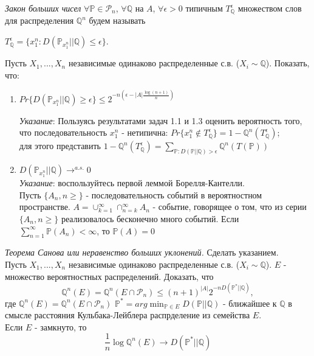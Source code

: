 \begin{problem}
\textit{Закон больших чисел}
$\forall \mathbb{P} \in \mathcal{P}_n $, $\forall \mathbb{Q}$ на $A$, $\forall \epsilon > 0$ типичным $T_{\mathbb{Q}}^{\epsilon}$ множеством слов для распределения $\mathbb{Q}^n$ будем называть
\begin{center}
$T_{\mathbb{Q}}^{\epsilon} = \{x_1^n: D(\mathbb{P}_{x_1^n}|| \mathbb{Q}) \leq \epsilon \}$.
\end{center}
Пусть $X_1, ..., X_n$ независимые одинаково распределенные с.в. ($X_i \sim \mathbb{Q}$). Показать, что:
\begin{enumerate}
\item 
\begin{center}
$Pr\{D(\mathbb{P}_{x_1^n} || \mathbb{Q}) \geq \epsilon \} \leq 2^{-n(\epsilon - |A|\frac{\log(n+1)}{n})}$
\end{center}
\textit{Указание}:
Пользуясь результатами задач 1.1 и 1.3 оценить вероятность того, что последовательность $x_1^n$ - нетипична: $Pr\{x_1^n \not\in T_{\mathbb{Q}}^{\epsilon}\} = 1 - \mathbb{Q}^n(T_{\mathbb{Q}}^{\epsilon})$;\\
для этого представить $1 - \mathbb{Q}^n(T_{\mathbb{Q}}^{\epsilon}) = \sum_{\mathbb{P}: D(\mathbb{P}||\mathbb{Q}) > \epsilon}{ \mathbb{Q}^n(T(\mathbb{P}))}$ 
\item $D(\mathbb{P}_{x_1^n}||\mathbb{Q})\rightarrow^{a.s.}0$\\
\textit{Указание}: воспользуйтесь первой леммой Борелля-Кантелли.\\
Пусть $\{A_n, n \geq \}$ - последовательность событий в вероятностном пространстве. $A = \cup_{k = 1}^{\infty} \cap_{n = k}^{\infty} A_n$ - событие, говорящее о том, что из серии $\{A_n, n \geq \}$ реализовалось бесконечно много событий.
Если $\sum_{n=1}^{\infty}\mathbb{P}(A_n) < \infty$, то $\mathbb{P}(A) = 0$
\end{enumerate}
\end{problem}

\begin{problem} \textit{Теорема Санова или неравенство больших уклонений.} Сделать указанием.\\
Пусть $X_1, ..., X_n$ независимые одинаково распределенные с.в. ($X_i \sim \mathbb{Q}$). $E$ - множество вероятностных распределений. Доказать, что
\begin{equation}
\mathbb{Q}^n(E) = \mathbb{Q}^n(E\cap \mathcal{P}_n) \leq (n+1)^{|A|}2^{-nD(\mathbb{P}^*||\mathbb{Q})},
\end{equation}
где $\mathbb{Q}^n(E) = \mathbb{Q}^n(E\cap \mathcal{P}_n)$ $\mathbb{P}^* = arg\min_{\mathbb{P}\in E}D(\mathbb{P}||\mathbb{Q})$ - ближайшее к $\mathbb{Q}$ в смысле расстояния Кульбака-Лейблера  распрделение из семейства $E$.\\
Если $E$ - замкнуто, то
\begin{equation}
\frac{1}{n} \log \mathbb{Q}^n(E) \rightarrow D(\mathbb{P}^*|| \mathbb{Q})
\end{equation}
\end{problem}

